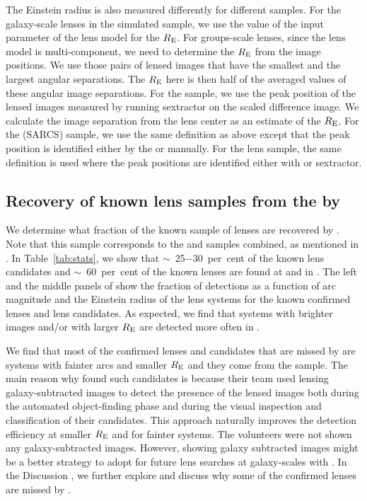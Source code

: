 \documentclass[useAMS,usenatbib,a4paper]{mn2e}
\begin{document}
The Einstein radius is also measured differently for
different samples. For the galaxy-scale lenses in the simulated sample,
we use the value of the input parameter of the lens model for the $R_{\rm E}$.
For groups-scale lenses, since the lens model is multi-component, we
need to determine the $R_{\rm E}$ from the image positions. We use those
pairs of lensed images that have the smallest and the largest angular
separations. The $R_{\rm E}$ here is then half of the averaged values of
these angular image separations. For the \rf sample, we use the peak
position of the lensed images measured by running {\sc sextractor} on
the scaled difference image. We calculate the image separation from the
lens center as an estimate of the $R_{\rm E}$. For the \af (SARCS)
sample, we use the same definition as above except that the peak
position is identified either by the \af or manually. For the \sw lens
sample, the same definition is used where the peak positions are
identified either with \af or {\sc sextractor}.



\subsection{Recovery of known lens samples from the \cfhtls by \sw}
\label{sec:results:known}

We determine what fraction of the known sample of lenses are recovered
by \sw. Note that this sample corresponds to the \rf and \af samples
combined, as mentioned in . In Table~\ref{tab:stats},
we show that $\sim$~25$-$30~per~cent of the known lens candidates and
$\sim$~60~per~cent of the known lenses are found at \StageOne and \StageTwo in
\sw. The left and the middle panels of  show the
fraction of detections as a function of arc magnitude and the Einstein
radius of the lens systems for the known confirmed lenses and lens
candidates. As expected, we find that systems with brighter images
and/or with larger $R_{\rm E}$ are detected more often in \sw.

We find that most of the confirmed lenses and candidates that are missed
by \sw are systems with fainter arcs and smaller $R_{\rm E}$ and they
come from the \rf sample. The main reason why \rf found such candidates
is because their team used lensing galaxy-subtracted images to detect
the presence of the lensed images both during the automated
object-finding phase and during the visual inspection and classification
of their candidates. This approach naturally improves the detection
efficiency at smaller $R_{\rm E}$ and for fainter systems. The \sw
volunteers were not shown any galaxy-subtracted images. However, showing
galaxy subtracted images might be a better strategy to adopt for future
lens searches at galaxy-scales with \sw. In the Discussion
, we further explore and discuss why some of the confirmed
lenses are missed by \sw.
\end{document}
